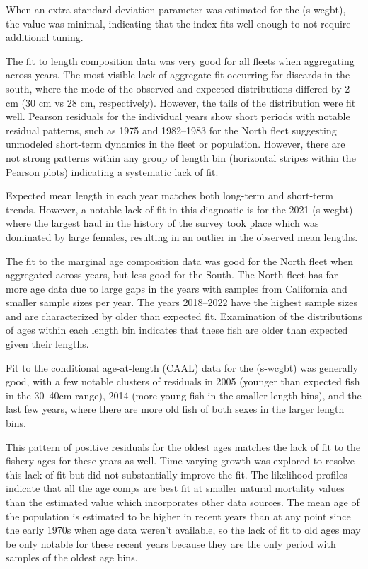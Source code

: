 \documentclass[
]{scrartcl}
\begin{document}
When an extra standard deviation parameter was estimated for the
(s-wcgbt), the value was minimal, indicating that the index fits well
enough to not require additional tuning.

The fit to length composition data was very good for all fleets when
aggregating across years. The most visible lack of aggregate fit
occurring for discards in the south, where the mode of the observed and
expected distributions differed by 2 cm (30 cm vs 28 cm, respectively).
However, the tails of the distribution were fit well. Pearson residuals
for the individual years show short periods with notable residual
patterns, such as 1975 and 1982--1983 for the North fleet suggesting
unmodeled short-term dynamics in the fleet or population. However, there
are not strong patterns within any group of length bin (horizontal
stripes within the Pearson plots) indicating a systematic lack of fit.

Expected mean length in each year matches both long-term and short-term
trends. However, a notable lack of fit in this diagnostic is for the
2021 (s-wcgbt) where the largest haul in the history of the survey took
place which was dominated by large females, resulting in an outlier in
the observed mean lengths.

The fit to the marginal age composition data was good for the North
fleet when aggregated across years, but less good for the South. The
North fleet has far more age data due to large gaps in the years with
samples from California and smaller sample sizes per year. The years
2018--2022 have the highest sample sizes and are characterized by older
than expected fit. Examination of the distributions of ages within each
length bin indicates that these fish are older than expected given their
lengths.

Fit to the conditional age-at-length (CAAL) data for the (s-wcgbt) was
generally good, with a few notable clusters of residuals in 2005
(younger than expected fish in the 30--40cm range), 2014 (more young
fish in the smaller length bins), and the last few years, where there
are more old fish of both sexes in the larger length bins.

This pattern of positive residuals for the oldest ages matches the lack
of fit to the fishery ages for these years as well. Time varying growth
was explored to resolve this lack of fit but did not substantially
improve the fit. The likelihood profiles indicate that all the age comps
are best fit at smaller natural mortality values than the estimated
value which incorporates other data sources. The mean age of the
population is estimated to be higher in recent years than at any point
since the early 1970s when age data weren't available, so the lack of
fit to old ages may be only notable for these recent years because they
are the only period with samples of the oldest age bins.
\end{document}
